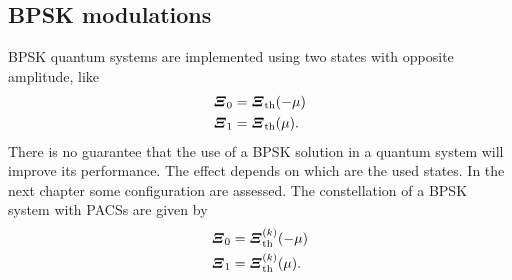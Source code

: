     \subsection{BPSK modulations}
        BPSK quantum systems are implemented using two states with opposite amplitude, like
        \begin{subequations}\begin{align}
            \bm{\relax{\varXi}}_0 &= \bm{\relax{\varXi}}_{\mathrm{th}}(-\mu)\\
            \bm{\relax{\varXi}}_1 &= \bm{\relax{\varXi}}_{\mathrm{th}}(\mu).
            \label{eq:2.1.2}
        \end{align}\end{subequations}
        There is no guarantee that the use of a BPSK solution in  a quantum system will 
        improve its performance. The effect depends on which are the used states. In the next chapter some 
        configuration are assessed. The constellation of a BPSK system with PACSs are given by
        \begin{subequations}\begin{align}
            \bm{\relax{\varXi}}_0 &= \bm{\relax{\varXi}}_{\mathrm{th}}^{(k)}(-\mu)\\
            \bm{\relax{\varXi}}_1 &= \bm{\relax{\varXi}}_{\mathrm{th}}^{(k)}(\mu).
            \label{eq:2.1.25}
        \end{align}\end{subequations}
